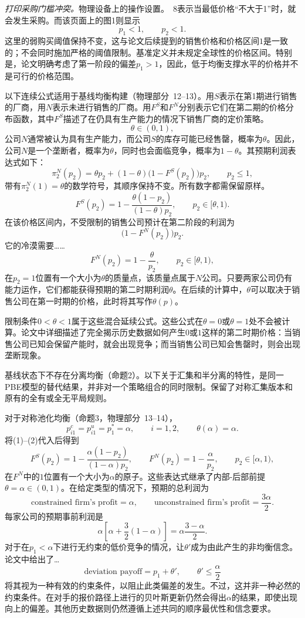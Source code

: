 \documentclass{article}
\begin{document}
\emph{打印采购门槛冲突。}物理设备上的操作设置。~8表示当最低价格“不大于1”时，就会发生采购。而该页面上的图1则显示
\[
p_1<1,\qquad p_2<1.
\]
这里的弱购买阈值保持不变，这与论文后续提到的销售价格和价格区间$1$是一致的；不会同时施加严格的阈值限制。基准定义并未规定全球性的价格区间。特别是，论文明确考虑了第一阶段的偏差$p_1>1$，因此，低于均衡支撑水平的价格并不是可行的价格范围。

以下连续公式适用于基线均衡构建（物理部分~12--13）。用$S$表示在第1期进行销售的厂商，用$N$表示未进行销售的厂商。用$F^{S}$和$F^{N}$分别表示它们在第二期的价格分布函数，其中$F^{S}$描述了在仍具有生产能力的情况下销售厂商的定价策略。
\[
\theta\in(0,1),
\]
公司$N$通常被认为具有生产能力，而公司$S$的库存可能已经售罄，概率为$\theta$。因此，公司$N$是一个垄断者，概率为$\theta$，同时也会面临竞争，概率为$1-\theta$。其预期利润表达式如下：
\[
\pi_2^{N}(p_2)
 =\theta p_2+(1-\theta)\bigl(1-F^{S}(p_2)\bigr)p_2,
\qquad p_2\leq 1,
\]
带有$\pi_2^{N}(1)=\theta$的数学符号，其顺序保持不变。所有数字都需保留原样。
\begin{equation}
F^{S}(p_2)=1-\frac{\theta(1-p_2)}{(1-\theta)p_2},
\qquad p_2\in[\theta,1).
\tag{1}
\end{equation}
在该价格区间内，不受限制的销售公司预计在第二阶段的利润为
\[
\bigl(1-F^{N}(p_2)\bigr)p_2.
\]
它的冷漠需要……
\begin{equation}
F^{N}(p_2)=1-\frac{\theta}{p_2},
\qquad p_2\in[\theta,1),
\tag{2}
\end{equation}
在$p_2=1$位置有一个大小为$\theta$的质量点，该质量点属于$N$公司。只要两家公司仍有能力运作，它们都能获得预期的第二时期利润$\theta$。在后续的计算中，$\theta$可以取决于销售公司在第一时期的价格，此时将其写作$\theta(p)$。

限制条件$0<\theta<1$属于这些混合延续公式。这些公式在$\theta=0$或$\theta=1$处不会被计算。论文中详细描述了完全揭示历史数据如何产生$0$或$1$这样的第二时期价格：当销售公司已知会保留产能时，就会出现竞争；而当销售公司已知会售罄时，则会出现垄断现象。

基线状态下不存在分离均衡（命题2）。以下关于汇集和半分离的特性，是同一PBE模型的替代结果，并非对一个策略组合的同时限制。保留了对称汇集版本和原有的全有或全无平局规则。

对于对称池化均衡（命题3，物理部分~13–14），
\[
p_{i1}^{c}=p_{i1}^{u}=p_1^{*}=\alpha,
\qquad i=1,2,
\qquad \theta(\alpha)=\alpha.
\]
将(1)--(2)代入后得到
\[
F^{S}(p_2)=1-\frac{\alpha(1-p_2)}{(1-\alpha)p_2},
\qquad
F^{N}(p_2)=1-\frac{\alpha}{p_2},
\qquad p_2\in[\alpha,1),
\]
在$F^{N}$中的$1$位置有一个大小为$\alpha$的原子。这些表达式继承了内部-后部前提$\theta=\alpha\in(0,1)$。在给定类型的情况下，预期的总利润为
\[
\text{constrained firm's profit}=\alpha,
\qquad
\text{unconstrained firm's profit}=\frac{3\alpha}{2}.
\]
每家公司的预期事前利润是
\[
\alpha\left[\alpha+\frac{3}{2}(1-\alpha)\right]
 =\alpha\frac{3-\alpha}{2}.
\]
对于在$p_1<\alpha$下进行无约束的低价竞争的情况，让$\theta'$成为由此产生的非均衡信念。论文中给出了…
\[
\text{deviation payoff}=p_1+\theta',
\qquad
\theta'\leq\frac{\alpha}{2}
\]
将其视为一种有效的约束条件，以阻止此类偏差的发生。不过，这并非一种必然的约束条件。在对手的报价路径上进行的贝叶斯更新仍然会得出$\alpha$的结果，即使出现向上的偏差。其他历史数据则仍然遵循上述共同的顺序最优性和信念要求。
\end{document}
